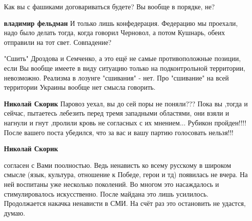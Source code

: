 \begin{itemize}
\begin{itemize}
Как вы с фашиками договариваться будете? Вы вообще в порядке, не?

 
\textbf{владимир фельдман} И только лишь конфедерация. Федерацию мы проехали,
надо было делать тогда, когда говорил Черновол, а потом Кушнарь, обеих
отправили на тот свет. Совпадение?

 

"Сшить" Дроздова и Семченко, а это ещё не самые противоположные позиции, если
Вы вообще имеете в виду ситуацию только на подконтрольной территории,
невозможно. Реализма в лозунге "сшивания" - нет. Про "сшивание" на всей
территории Украины вообще нет смысла говорить.

 
\textbf{Николай Скорик} Паровоз уехал, вы до сей поры не поняли??? Пока вы ,тогда
и сейчас, пытаетесь лебезить перед тремя западными областями, они взяли и
нагнули и гнут ,пролили кровь не согласных с их мнением... Рубикон пройден!!!!
После вашего поста убедился, что за вас и вашу партию голосовать нельзя!!!

 
\textbf{Николай Скорик} 

согласен с Вами поолностью. Ведь ненависть ко всему русскому в широком смысле
(язык, культура, отношение к Победе, герои и тд) появилась не вчера. На ней
воспитаны уже несколько поколений. Во многом это насаждалось и стимулировалось
искусственно. После майдана это лишь усилилось.  Продолжается накачка ненависти
в СМИ. На счёт раз это остановить не удастся, думаю. 


\end{itemize}
\end{itemize}
